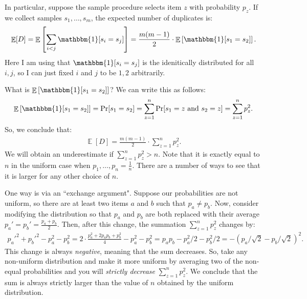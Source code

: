 \documentclass[11pt]{article}
\DeclareMathOperator*{\E}{\mathbb{E}}
\begin{document}
In particular, suppose the sample procedure selects item $z$ with probability $p_z$. If we collect samples $s_1, \ldots, s_m$, the expected number of duplicates is: 
\begin{align*}
\E[D] = \E\left[\sum_{i<j} \mathbbm{1}[s_i = s_j]\right] = \frac{m(m-1)}{2}\cdot \E\left[\mathbbm{1}[s_1 = s_2]\right].
\end{align*}
Here I am using that $\mathbbm{1}[s_i = s_j]$ is the idenitically distributed for all $i,j$, so I can just fixed $i$ and $j$ to be $1,2$ arbitrarily. 

What is $\E\left[\mathbbm{1}[s_1 = s_2]\right]$? We can write this as follows:
\begin{align*}
	\E\left[\mathbbm{1}[s_1 = s_2]\right] = \Pr[s_1 = s_2] = \sum_{z=1}^n \Pr[s_1 = z \text{ and } s_2 = z] = \sum_{z=1}^n p_z^2. 
\end{align*}
So, we conclude that: 
\begin{align*}
	\E[D] =  \frac{m(m-1)}{2}\cdot \sum_{z=1}^n p_z^2.
\end{align*}
We will obtain an underestimate if $\sum_{z=1}^n p_z^2 > n$. Note that it is exactly equal to $n$ in the uniform case when $p_1, \ldots, p_n = \frac{1}{n}$. There are a number of ways to see that it is larger for any other choice of $n$. 

One way is via an ``exchange argument". Suppose our probabilities are not uniform, so there are at least two items $a$ and $b$ such that $p_a \neq p_b$. Now, consider modifying the distribution so that $p_a$ and $p_b$ are both replaced with their average $p_a' = p_b' = \frac{p_a+p_b}{2}$. Then, after this change, the summation $\sum_{z=1}^n p_z^2$ changes by:
\begin{align*}
	{p_a'}^2 + {p_b'}^2 - p_a^2 - p_b^2 = 2\cdot \frac{p_a^2 + 2p_ap_b + p_b^2}{4} - p_a^2 - p_b^2 = p_ap_b - p_a^2/2 -p_b^2/2 = -(p_a/\sqrt{2} - p_b/\sqrt{2})^2.
\end{align*}
This change is always \emph{negative}, meaning that the sum decreases. So, take any non-uniform distribution and make it more uniform by averaging two of the non-equal probabilities and you will \emph{strictly decrease} $\sum_{z=1}^n p_z^2$. We conclude that the sum is always strictly larger than the value of $n$ obtained by the uniform distribution. 
\end{document}
